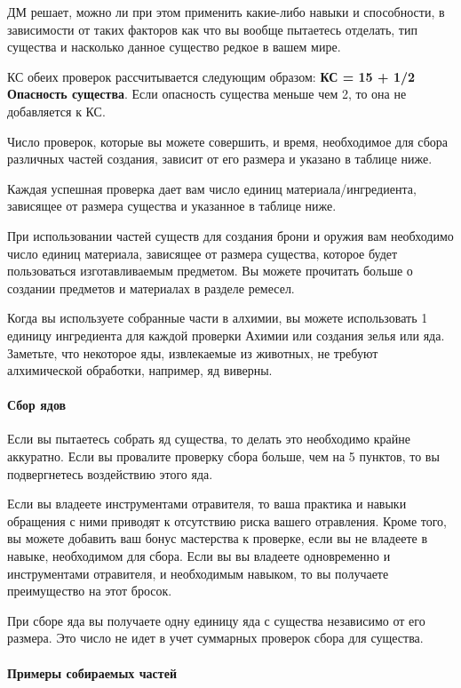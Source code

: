 \documentclass[a4paper, 9pt, twocolumn]{book}
\begin{document}
	ДМ решает, можно ли при этом применить какие-либо навыки и способности, в зависимости от таких факторов как что вы вообще пытаетесь отделать, тип существа и насколько данное существо редкое в вашем мире.
	
	КС обеих проверок рассчитывается следующим образом: \textbf{КС = 15 + 1/2 Опасность существа}. Если опасность существа меньше чем 2, то она не добавляется к КС.
	
	Число проверок, которые вы можете совершить, и время, необходимое для сбора различных частей создания, зависит от его размера и указано в таблице ниже.
	
	Каждая успешная проверка дает вам число единиц материала/ингредиента, зависящее от размера существа и указанное в таблице ниже.
	
	При использовании частей существ для создания брони и оружия вам необходимо число единиц материала, зависящее от размера существа, которое будет пользоваться изготавливаемым предметом. Вы можете прочитать больше о создании предметов и материалах в разделе ремесел.
	
	Когда вы используете собранные части в алхимии, вы можете использовать 1 единицу ингредиента для каждой проверки Ахимии или создания зелья или яда. Заметьте, что некоторое яды, извлекаемые из животных, не требуют алхимической обработки, например, яд виверны.
	
	\paragraph*{Сбор ядов}
	
	Если вы пытаетесь собрать яд существа, то делать это необходимо крайне аккуратно. Если вы провалите проверку сбора больше, чем на 5 пунктов, то вы подвергнетесь воздействию этого яда.
	
	Если вы владеете инструментами отравителя, то ваша практика и навыки обращения с ними приводят к отсутствию риска вашего отравления. Кроме того, вы можете добавить ваш бонус мастерства к проверке, если вы не владеете в навыке, необходимом для сбора. Если вы вы владеете одновременно и инструментами отравителя, и необходимым навыком, то вы получаете преимущество на этот бросок.
	
	При сборе яда вы получаете одну единицу яда с существа независимо от его размера. Это число не идет в учет суммарных проверок сбора для существа.
	
	\paragraph*{Примеры собираемых частей}
	
\end{document}
